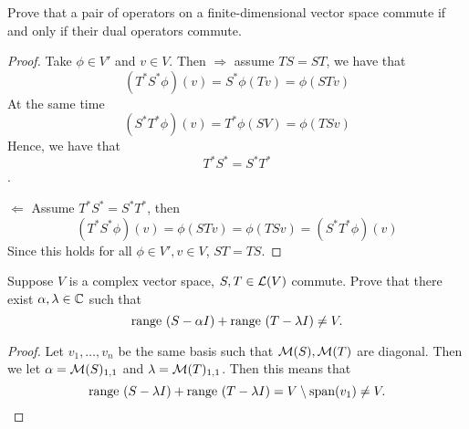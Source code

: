 \documentclass{extarticle}
\begin{document}
\begin{problem}{5}
    Prove that a pair of operators on a finite-dimensional vector space commute if and only if 
    their dual operators commute.
\end{problem}

\begin{proof}
Take \(\phi \in V'\) and \(v \in V\). Then \(\Rightarrow\) assume \(TS = ST\), we have that 
\[(T^* S^* \phi)(v) = S^* \phi(Tv) = \phi (STv)\]
At the same time 
\[(S^*T^* \phi)(v) = T^* \phi (SV) = \phi (TSv)\]
Hence, we have that \[T^*S^* = S^*T^*\]. 

\(\Leftarrow\) Assume \(T^* S^* = S^* T^*\), then 
\[(T^* S^* \phi)(v) = \phi(STv) = \phi (TSv) = (S^*T^* \phi)(v)\]
Since this holds for all \(\phi \in V', v \in V\), \(ST = TS\).
\end{proof}

\begin{problem}{6}
    Suppose \(V\) is a complex vector space, \(S,T \in \mathcal{L}(V)\) commute. Prove that there exist 
    \(\alpha, \lambda \in \mathbb{C}\) such that 
    \[\text{range } (S - \alpha I) + \text{range } (T - \lambda I) \neq V.\]
\end{problem}

\begin{proof}
Let \(v_1, \ldots, v_n\) be the same basis such that \(\mathcal{M}(S), \mathcal{M}(T)\) are diagonal. Then we let 
\(\alpha = \mathcal{M}(S)_{1,1}\) and \(\lambda = \mathcal{M}(T)_{1, 1}\). Then this means that 
\[\text{range } (S - \lambda I) + \text{range } (T - \lambda I) = V \setminus \text{span}(v_1) \neq V.\]
\end{proof}
\end{document}

